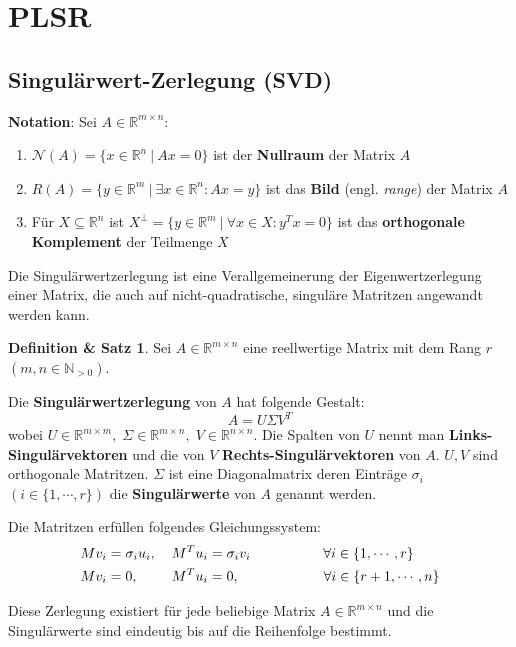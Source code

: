 \documentclass{article}
\newcommand{\R}[0]{\mathbb{R}}
\theoremstyle{plain}
\theoremstyle{definition}
\newtheorem{definthm}[thm]{Definition \& Satz}
\begin{document}
\cite[S. 61ff.]{richter2021inverse}

\section{PLSR}

\subsection{Singulärwert-Zerlegung (SVD)}
\textbf{Notation}:
Sei $A \in \R^{m \times n}$:
\begin{enumerate}
    \item $\mathcal{N}(A) = \{x \in \R^n \: | \: Ax = 0\}$ ist der \textbf{Nullraum} der Matrix $A$
    \item $R(A) = \{y \in \R^m \: | \: \exists x \in \R^n: Ax = y\}$ ist das \textbf{Bild} (engl. \textit{range}) der Matrix $A$
    \item Für $X \subseteq \R^n$ ist $X^{\bot} = \{y \in \R^m \: | \: \forall x \in X: y^Tx = 0\}$ ist das \textbf{orthogonale Komplement} der Teilmenge $X$
\end{enumerate}

Die Singulärwertzerlegung ist eine Verallgemeinerung der Eigenwertzerlegung einer Matrix, die auch auf nicht-quadratische, singuläre Matritzen angewandt werden kann.

\begin{definthm}
    Sei $A \in \R^{m \times n}$ eine reellwertige Matrix mit dem Rang $r$ $(m,n \in \mathbb{N}_{>0})$.

    Die \textbf{Singulärwertzerlegung} von $A$  hat folgende Gestalt:
    \begin{equation}
        A = U \Sigma V^T
    \end{equation}
    wobei $U \in \R^{m \times m}, \; \Sigma \in \R^{m \times n}, \; V \in \R^{n \times n}$.
    Die Spalten von $U$ nennt man \textbf{Links-Singulärvektoren} und die von $V$ \textbf{Rechts-Singulärvektoren} von $A$. $U, V$ sind orthogonale Matritzen.
    $\Sigma$ ist eine Diagonalmatrix deren Einträge $\sigma_i$ $(i \in \{1, \cdots, r\})$ die \textbf{Singulärwerte} von $A$ genannt werden.
    
    Die Matritzen erfüllen folgendes Gleichungssystem:
    \begin{align}
        &Mv_i = \sigma_i u_i, \: &&M^Tu_i = \sigma_iv_i \hspace*{52px} \forall i \in \{1, \cdots, r\} \\
        &Mv_i = 0, \: &&M^Tu_i = 0, \hspace*{60px} \forall i \in \{r + 1, \cdots, n\}
    \end{align}

    Diese Zerlegung existiert für jede beliebige Matrix $A \in \R^{m \times n}$ und die Singulärwerte sind eindeutig bis auf die Reihenfolge bestimmt.
\end{definthm}
\end{document}
